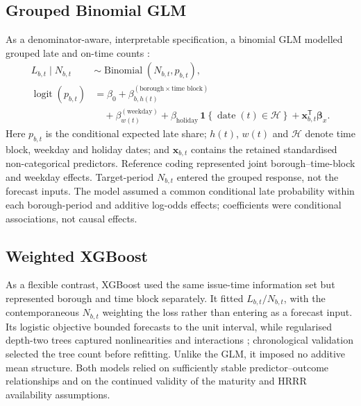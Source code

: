 \documentclass[11pt]{article}
\begin{document}
\subsection{Grouped Binomial GLM}
As a denominator-aware, interpretable specification, a binomial GLM modelled
grouped late and on-time counts \cite{mast30027_binomial_regression}:
\begingroup
\setlength{\abovedisplayskip}{2pt}
\setlength{\belowdisplayskip}{2pt}
\begin{equation*}
\begin{aligned}
    L_{b,t}\mid N_{b,t} &\sim
        \operatorname{Binomial}(N_{b,t},p_{b,t}),\\
    \operatorname{logit}(p_{b,t})
        &=\beta_0
          +\beta^{(\text{borough}\times\text{time block})}_{b,h(t)}\\
        &\quad+\beta^{(\mathrm{weekday})}_{w(t)}
          +\beta_{\mathrm{holiday}}\,
          \mathbf{1}\!\left\{\operatorname{date}(t)\in\mathcal H\right\}
          +\boldsymbol{x}_{b,t}^{\mathsf T}\boldsymbol{\beta}_x.
\end{aligned}
\end{equation*}
\endgroup
Here \(p_{b,t}\) is the conditional expected late share; \(h(t)\), \(w(t)\) and
\(\mathcal H\) denote time block, weekday and holiday dates; and
\(\boldsymbol{x}_{b,t}\) contains the retained standardised non-categorical
predictors. Reference coding represented joint borough--time-block and weekday
effects. Target-period \(N_{b,t}\) entered the grouped response, not the forecast
inputs. The model assumed a common conditional late probability within each
borough-period and additive log-odds effects; coefficients were conditional
associations, not causal effects.

\subsection{Weighted XGBoost}
As a flexible contrast, XGBoost used the same issue-time information set but
represented borough and time block separately. It fitted \(L_{b,t}/N_{b,t}\),
with the contemporaneous \(N_{b,t}\) weighting the loss rather than entering as
a forecast input. Its logistic objective bounded forecasts to the unit interval,
while regularised depth-two trees captured nonlinearities and interactions
\cite{chen_guestrin_xgboost}; chronological validation selected the tree count
before refitting. Unlike the GLM, it imposed no additive mean structure. Both
models relied on sufficiently stable predictor--outcome relationships and on the
continued validity of the maturity and HRRR availability assumptions.
\end{document}
